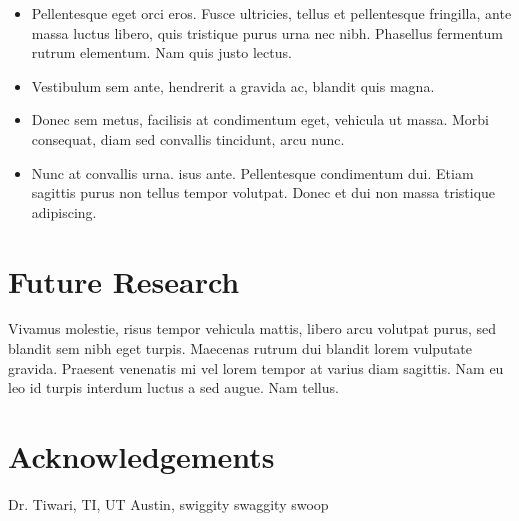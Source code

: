\documentclass[a0,landscape]{a0poster}
\begin{document}
\begin{multicols}{4}
\begin{itemize}
\item Pellentesque eget orci eros. Fusce ultricies, tellus et pellentesque fringilla, ante massa luctus libero, quis tristique purus urna nec nibh. Phasellus fermentum rutrum elementum. Nam quis justo lectus.
\item Vestibulum sem ante, hendrerit a gravida ac, blandit quis magna.
\item Donec sem metus, facilisis at condimentum eget, vehicula ut massa. Morbi consequat, diam sed convallis tincidunt, arcu nunc.
\item Nunc at convallis urna. isus ante. Pellentesque condimentum dui. Etiam sagittis purus non tellus tempor volutpat. Donec et dui non massa tristique adipiscing.
\end{itemize}

\color{DarkSlateGray} %


\section*{Future Research}

Vivamus molestie, risus tempor vehicula mattis, libero arcu volutpat purus, sed blandit sem nibh eget turpis. Maecenas rutrum dui blandit lorem vulputate gravida. Praesent venenatis mi vel lorem tempor at varius diam sagittis. Nam eu leo id turpis interdum luctus a sed augue. Nam tellus.



\section*{Acknowledgements}

Dr. Tiwari, TI, UT Austin, swiggity swaggity swoop


\end{multicols}
\end{document}
